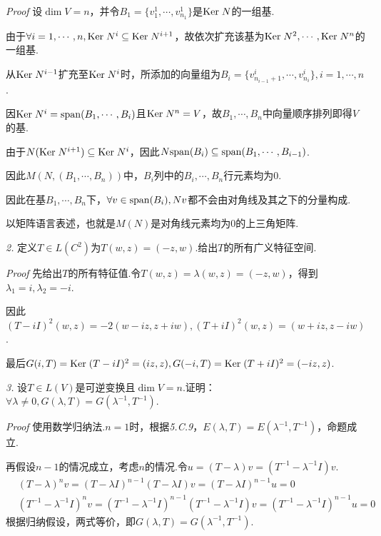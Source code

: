 \textit{Proof}
设\(\dim V=n\)，并令\(B_1=\{v_1^1,\cdots,v_{n_1}^1\}\)是\(\mathrm{Ker \;} N\)的一组基.

由于\(\forall i=1,\cdots,n,\mathrm{Ker \;} N^i \subseteq \mathrm{Ker \;} N^{i+1}\)，故依次扩充该基为\(\mathrm{Ker \;} N^2,\cdots,\mathrm{Ker \;} N^n\)的一组基.

从\(\mathrm{Ker \;} N^{i-1}\)扩充至\(\mathrm{Ker \;} N^i\)时，所添加的向量组为\(B_i=\{v_{n_{i-1}+1}^i,\cdots,v_{n_i}^i\},i=1,\cdots,n\).

因\(\mathrm{Ker \;} N^i=\mathrm{span}(B_1,\cdots,B_i)\)且\(\mathrm{Ker \;} N^n=V\)，故\(B_1,\cdots,B_n\)中向量顺序排列即得\(V\)的基.

由于\(N(\mathrm{Ker \;} N^{i+1}) \subseteq \mathrm{Ker \;} N^i\)，因此\(N \mathrm{span}(B_i) \subseteq \mathrm{span}(B_1,\cdots,B_{i-1})\).

因此\(M(N,(B_1,\cdots,B_n))\)中，\(B_i\)列中的\(B_i,\cdots,B_n\)行元素均为\(0\).

因此在基\(B_1,\cdots,B_n\)下，\(\forall v \in \mathrm{span}(B_i),Nv\)都不会由对角线及其之下的分量构成.

以矩阵语言表述，也就是\(M(N)\)是对角线元素均为\(0\)的上三角矩阵.

\newpage

\textit{2.}
定义\(T \in L(C^2)\)为\(T(w,z)=(-z,w)\).给出\(T\)的所有广义特征空间.

\textit{Proof}
先给出\(T\)的所有特征值.令\(T(w,z)=\lambda(w,z)=(-z,w)\)，得到\(\lambda_1=i,\lambda_2=-i\).

因此\((T-iI)^2(w,z)=-2(w-iz,z+iw),(T+iI)^2(w,z)=(w+iz,z-iw)\).

最后\(G(i,T)=\mathrm{Ker \;} (T-iI)^2=(iz,z),G(-i,T)=\mathrm{Ker \;} (T+iI)^2=(-iz,z)\).

\hspace*{\fill}

\textit{3.}
设\(T \in L(V)\)是可逆变换且\(\dim V=n\).证明：\(\forall \lambda \ne 0,G(\lambda,T)=G(\lambda^{-1},T^{-1})\).

\textit{Proof}
使用数学归纳法.\(n=1\)时，根据\textit{5.C.9}，\(E(\lambda,T)=E(\lambda^{-1},T^{-1})\)，命题成立.

再假设\(n-1\)的情况成立，考虑\(n\)的情况.令\(u=(T-\lambda)v=(T^{-1}-\lambda^{-1} I)v\).
    \begin{align*}
        &(T-\lambda)^n v=(T-\lambda I)^{n-1}(T-\lambda I)v=(T-\lambda I)^{n-1}u=0 \\
        &(T^{-1}-\lambda^{-1} I)^n v=(T^{-1}-\lambda^{-1} I)^{n-1}(T^{-1}-\lambda^{-1} I)v=(T^{-1}-\lambda^{-1} I)^{n-1}u=0
    \end{align*}
根据归纳假设，两式等价，即\(G(\lambda,T)=G(\lambda^{-1},T^{-1})\).

